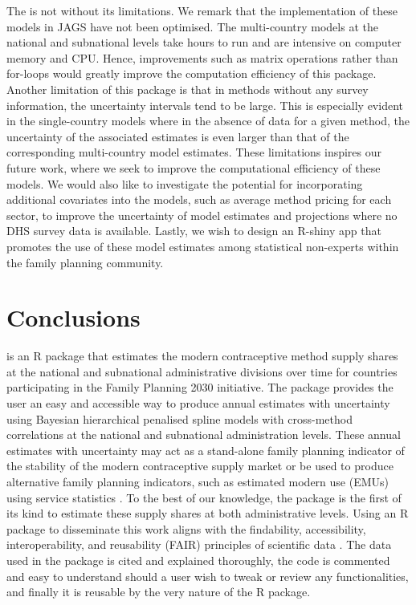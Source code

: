 The  is not without its limitations. We remark that the implementation of these models in JAGS have not been optimised. The multi-country models at the national and subnational levels take hours to run and are intensive on computer memory and CPU. Hence, improvements such as matrix operations rather than for-loops would greatly improve the computation efficiency of this package. Another limitation of this package is that in methods without any survey information, the uncertainty intervals tend to be large. This is especially evident in the single-country models where in the absence of data for a given method, the uncertainty of the associated estimates is even larger than that of the corresponding multi-country model estimates. These limitations inspires our future work, where we seek to improve the computational efficiency of these models. We would also like to investigate the potential for incorporating additional covariates into the models, such as average method pricing for each sector, to improve the uncertainty of model estimates and projections where no DHS survey data is available. Lastly, we wish to design an R-shiny app that promotes the use of these model estimates among statistical non-experts within the family planning community.

\section{Conclusions}\label{conclusions}

 is an R package that estimates the modern contraceptive method supply shares at the national and subnational administrative divisions over time for countries participating in the Family Planning 2030 initiative. The package provides the user an easy and accessible way to produce annual estimates with uncertainty using Bayesian hierarchical penalised spline models with cross-method correlations at the national and subnational administration levels. These annual estimates with uncertainty may act as a stand-alone family planning indicator of the stability of the modern contraceptive supply market or be used to produce alternative family planning indicators, such as estimated modern use (EMUs) using service statistics \citep{Track20}. To the best of our knowledge, the package is the first of its kind to estimate these supply shares at both administrative levels. Using an R package to disseminate this work aligns with the findability, accessibility, interoperability, and reusability (FAIR) principles of scientific data \citep{Wilkinson2016}. The data used in the package is cited and explained thoroughly, the code is commented and easy to understand should a user wish to tweak or review any functionalities, and finally it is reusable by the very nature of the R package.

